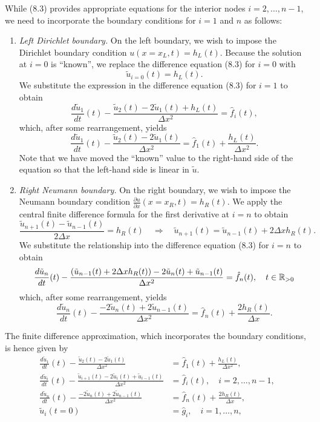 While (8.3) provides appropriate equations for the interior nodes $i = 2, \dots, n - 1$, we need to incorporate the boundary conditions for $i = 1$ and $n$ as follows:
\begin{enumerate}
    \item \textit{Left Dirichlet boundary.} On the left boundary, we wish to impose the Dirichlet boundary condition $u(x = x_L, t) = h_L(t)$. Because the solution at $i = 0$ is ``known'', we replace the difference equation (8.3) for $i = 0$ with
    \[\tilde{u}_{i=0}(t) = h_L(t).\]
    We substitute the expression in the difference equation (8.3) for $i = 1$ to obtain
    \[\frac{d\tilde{u}_1}{dt}(t) - \frac{\tilde{u}_2(t) - 2\tilde{u}_1(t) + h_L(t)}{\Delta x^2} = \hat{f}_i(t),\]
    which, after some rearrangement, yields
    \[\frac{d\tilde{u}_1}{dt}(t) - \frac{\tilde{u}_2(t) - 2\tilde{u}_1(t)}{\Delta x^2} = \hat{f}_1(t) + \frac{h_L(t)}{\Delta x^2}.\]
    Note that we have moved the ``known'' value to the right-hand side of the equation so that the left-hand side is linear in $\tilde{u}$.
    \item \textit{Right Neumann boundary.} On the right boundary, we wish to impose the Neumann boundary condition $\frac{\partial u}{\partial x}(x = x_R, t) = h_R(t)$. We apply the central finite difference formula for the first derivative at $i = n$ to obtain
    \[\frac{\tilde{u}_{n+1}(t) - \tilde{u}_{n-1}(t)}{2\Delta x} = h_R(t) \quad \Rightarrow \quad \tilde{u}_{n+1}(t) = \tilde{u}_{n-1}(t) + 2\Delta x h_R(t).\]
    We substitute the relationship into the difference equation (8.3) for $i = n$ to obtain
    \[\frac{d\tilde{u}_n}{dt}(t) - \frac{(\tilde{u}_{n-1}(t) + 2\Delta x h_R(t)) - 2\tilde{u}_n(t) + \tilde{u}_{n-1}(t)}{\Delta x^2} = \hat{f}_n(t), \quad t \in \mathbb{R}_{>0}\]
    which, after some rearrangement, yields
    \[\frac{d\tilde{u}_n}{dt}(t) - \frac{-2\tilde{u}_n(t) + 2\tilde{u}_{n-1}(t)}{\Delta x^2} = \hat{f}_n(t) + \frac{2h_R(t)}{\Delta x}.\]
\end{enumerate}
The finite difference approximation, which incorporates the boundary conditions, is hence given by
\begin{equation*}
    \begin{aligned}
        \frac{d\tilde{u}_1}{dt}(t) - \frac{\tilde{u}_2(t) - 2\tilde{u}_1(t)}{\Delta x^2} &= \hat{f}_1(t) + \frac{h_L(t)}{\Delta x^2}, \\
        \frac{d\tilde{u}_i}{dt}(t) - \frac{\tilde{u}_{i+1}(t) - 2\tilde{u}_i(t) + \tilde{u}_{i-1}(t)}{\Delta x^2} &= \hat{f}_i(t), \quad i = 2, \dots, n - 1, \\
        \frac{d\tilde{u}_n}{dt}(t) - \frac{-2\tilde{u}_n(t) + 2\tilde{u}_{n-1}(t)}{\Delta x^2} &= \hat{f}_n(t) + \frac{2h_R(t)}{\Delta x}, \\
        \tilde{u}_i(t = 0) &= \hat{g}_i, \quad i = 1, \dots, n,
    \end{aligned} \tag{8.4}
\end{equation*}
